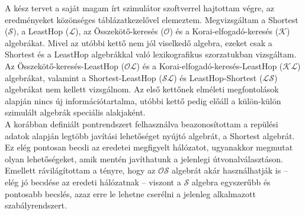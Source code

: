   A kész tervet a saját magam írt szimulátor szoftverrel hajtottam végre, az eredményeket közönséges táblázatkezelővel elemeztem. Megvizsgáltam a Shortest ($\mathcal{S}$), a LeastHop ($\mathcal{L}$), az Összekötő-keresés ($\mathcal{O}$) és a Korai-elfogadó-keresés ($\mathcal{K}$) algebrákat. Mivel az utóbbi kettő nem jól viselkedő algebra, ezeket csak a Shortest és a LeastHop algebrákkal való lexikografikus szorzatukban vizsgáltam. Az Összekötő-keresés-LeastHop ($\mathcal{OL}$) és a Korai-elfogadó-keresés-LeastHop ($\mathcal{KL}$) algebrákat, valamint a Shortest-LeastHop ($\mathcal{SL}$) és LeastHop-Shortest ($\mathcal{LS}$) algebrákat nem kellett vizsgálnom. Az első kettőnek elméleti megfontolások alapján nincs új információtartalma, utóbbi kettő pedig előáll a külön-külön szimulált algebrák speciális alakjaként.\\

  A korábban definiált pontrendszert felhasználva beazonosítottam a repülési adatok alapján legtöbb javítási lehetőséget nyújtó algebrát, a Shortest algebrát. Ez elég pontosan becsli az eredetei megfigyelt hálózatot, ugyanakkor megmutat olyan lehetőségeket, amik mentén javíthatunk a jelenlegi útvonalválasztáson.
  Emellett rávilágítottam a tényre, hogy az $\mathcal{OS}$ algebrát akár használhatják is -- elég jó becslése az eredeti hálózatnak -- viszont a $\mathcal{S}$ algebra egyszerűbb és pontosabb becslés, azaz erre le lehetne cserélni a jelenleg alkalmazott szabályrendszert.
